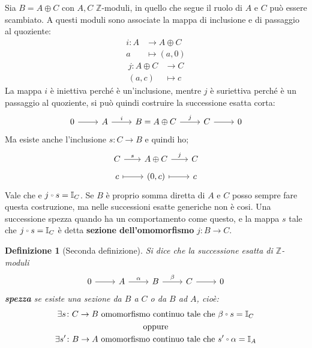 \documentclass[10pt, twoside=false, x11names]{scrbook}
\newtheorem{definition}[theorem]{Definizione}
\newcommand{\Z}{\mathbb{Z}}
\newcommand{\im}[1]{\mathrm{Im}( #1 )}
\renewcommand{\ker}[1]{\mathrm{Ker}( #1)}
\newcommand{\Id}[1][]{\mathbb{I}_#1}
\let\latexcirc=\circ
\newcommand{\ccirc}{\mathbin{\mathchoice
  {\xcirc\scriptstyle}
  {\xcirc\scriptstyle}
  {\xcirc\scriptscriptstyle}
  {\xcirc\scriptscriptstyle}
}}
\newcommand{\xcirc}[1]{\vcenter{\hbox{$#1\latexcirc$}}}
\let\circ\ccirc
\begin{document}
Sia $ B = A \oplus C $ con $ A, C $ $ \Z $-moduli, in quello che segue il ruolo di
$ A $ e $ C $ può essere scambiato. A questi moduli sono associate la mappa
di inclusione e di passaggio al quoziente:
\begin{align*}
  i \colon A & \to A \oplus C \\
  a & \mapsto (a, 0)
\end{align*}
\begin{align*}
  j \colon A \oplus C & \to C \\
  (a,c) & \mapsto c
\end{align*}
La mappa $ i $ è iniettiva perché è un'inclusione, mentre $ j $ è suriettiva perché
è un passaggio al quoziente, si può quindi costruire la successione esatta corta:
\[
  \begin{tikzcd}
    0 \arrow{r}{} & A \arrow{r}{i} & B = A \oplus C \arrow{r}{j} & C \arrow{r}{} & 0
  \end{tikzcd}
\]
Ma esiste anche l'inclusione $ s \colon C \to B $ e quindi ho;
\[
  \begin{tikzcd}[nodes={row sep=5pt, column sep = 20pt}]
    C \rar{s} & A \oplus C \rar{j} & C \\
    c  \arrow[mapsto]{r}{} & (0,c) \arrow[mapsto]{r}{} & c
  \end{tikzcd}
\]
Vale che e $ j \circ s = \Id{C} $. Se $ B $ è proprio somma diretta di $ A $ e $ C $
posso sempre fare questa costruzione, ma nelle successioni esatte generiche non è cosi.
Una successione spezza quando ha un comportamento come questo, e la mappa $ s $
tale che $ j \circ s = \Id{C} $ è detta \textbf{sezione dell'omomorfismo}
$ j \colon B \to C $.
\begin{definition}[Seconda definizione]
  Si dice che la successione esatta di $ \Z $-moduli
  \[
    \begin{tikzcd}
      0 \arrow{r}{} & A \arrow{r}{\alpha} & B \arrow{r}{\beta} & C \arrow{r}{} & 0
    \end{tikzcd}
  \]
  \textbf{spezza} se esiste una sezione da $ B $ a $ C $
  o da $ B $ ad $ A $, cioè:
  \begin{gather*}
    \exists s \colon C \to B \text{ omomorfismo continuo tale che } \beta \circ s = \Id{C} \\
    \text{oppure} \\
    \exists s' \colon B \to A \text{ omomorfismo continuo tale che } s' \circ \alpha = \Id{A}
  \end{gather*}
\end{definition}
\end{document}
